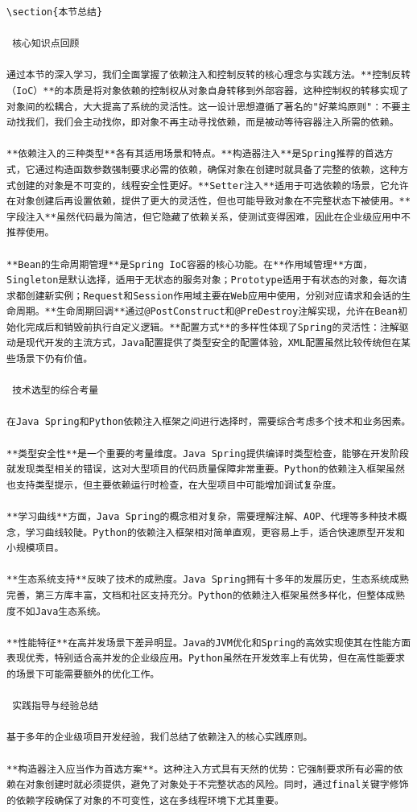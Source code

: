 \begin{lstlisting}
\section{本节总结}

 核心知识点回顾

通过本节的深入学习，我们全面掌握了依赖注入和控制反转的核心理念与实践方法。**控制反转（IoC）**的本质是将对象依赖的控制权从对象自身转移到外部容器，这种控制权的转移实现了对象间的松耦合，大大提高了系统的灵活性。这一设计思想遵循了著名的"好莱坞原则"：不要主动找我们，我们会主动找你，即对象不再主动寻找依赖，而是被动等待容器注入所需的依赖。

**依赖注入的三种类型**各有其适用场景和特点。**构造器注入**是Spring推荐的首选方式，它通过构造函数参数强制要求必需的依赖，确保对象在创建时就具备了完整的依赖，这种方式创建的对象是不可变的，线程安全性更好。**Setter注入**适用于可选依赖的场景，它允许在对象创建后再设置依赖，提供了更大的灵活性，但也可能导致对象在不完整状态下被使用。**字段注入**虽然代码最为简洁，但它隐藏了依赖关系，使测试变得困难，因此在企业级应用中不推荐使用。

**Bean的生命周期管理**是Spring IoC容器的核心功能。在**作用域管理**方面，Singleton是默认选择，适用于无状态的服务对象；Prototype适用于有状态的对象，每次请求都创建新实例；Request和Session作用域主要在Web应用中使用，分别对应请求和会话的生命周期。**生命周期回调**通过@PostConstruct和@PreDestroy注解实现，允许在Bean初始化完成后和销毁前执行自定义逻辑。**配置方式**的多样性体现了Spring的灵活性：注解驱动是现代开发的主流方式，Java配置提供了类型安全的配置体验，XML配置虽然比较传统但在某些场景下仍有价值。

 技术选型的综合考量

在Java Spring和Python依赖注入框架之间进行选择时，需要综合考虑多个技术和业务因素。

**类型安全性**是一个重要的考量维度。Java Spring提供编译时类型检查，能够在开发阶段就发现类型相关的错误，这对大型项目的代码质量保障非常重要。Python的依赖注入框架虽然也支持类型提示，但主要依赖运行时检查，在大型项目中可能增加调试复杂度。

**学习曲线**方面，Java Spring的概念相对复杂，需要理解注解、AOP、代理等多种技术概念，学习曲线较陡。Python的依赖注入框架相对简单直观，更容易上手，适合快速原型开发和小规模项目。

**生态系统支持**反映了技术的成熟度。Java Spring拥有十多年的发展历史，生态系统成熟完善，第三方库丰富，文档和社区支持充分。Python的依赖注入框架虽然多样化，但整体成熟度不如Java生态系统。

**性能特征**在高并发场景下差异明显。Java的JVM优化和Spring的高效实现使其在性能方面表现优秀，特别适合高并发的企业级应用。Python虽然在开发效率上有优势，但在高性能要求的场景下可能需要额外的优化工作。

 实践指导与经验总结

基于多年的企业级项目开发经验，我们总结了依赖注入的核心实践原则。

**构造器注入应当作为首选方案**。这种注入方式具有天然的优势：它强制要求所有必需的依赖在对象创建时就必须提供，避免了对象处于不完整状态的风险。同时，通过final关键字修饰的依赖字段确保了对象的不可变性，这在多线程环境下尤其重要。
\end{lstlisting}

